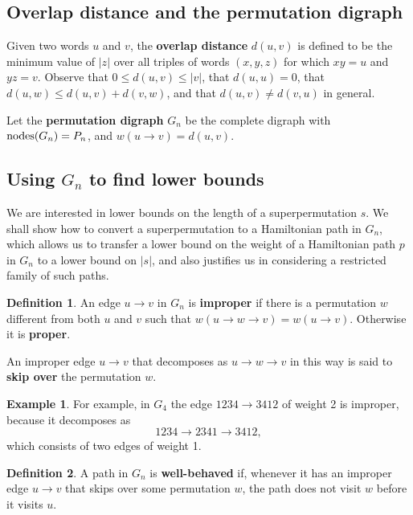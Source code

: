 \documentclass[a4paper]{article}
\theoremstyle{definition}
\newtheorem{defn}{Definition}[section]
\newtheorem{example}{Example}[section]
\theoremstyle{remark}
\let\definiendum\textbf
\begin{document}
\subsection{Overlap distance and the permutation digraph}
Given two words $u$ and $v$, the \definiendum{overlap distance} $d(u,v)$ is defined to be the minimum value of $|z|$ over all triples of words $(x, y, z)$ for which $xy=u$ and $yz=v$. Observe that $0\le d(u,v)\le|v|$, that $d(u,u)=0$, that $d(u,w)\le d(u,v)+d(v,w)$, and that $d(u,v)\ne d(v,u)$ in general.

Let the \definiendum{permutation digraph} $G_n$ be the complete digraph with $\mathrm{nodes}(G_n)=P_n$, and $w(u\to v) = d(u, v)$.

\subsection{Using $G_n$ to find lower bounds}
We are interested in lower bounds on the length of a superpermutation $s$. We shall show how to convert a superpermutation to a Hamiltonian path in $G_n$, which allows us to transfer a lower bound on the weight of a Hamiltonian path $p$ in $G_n$ to a lower bound on $|s|$, and also justifies us in considering a restricted family of such paths.

\begin{defn}
    An edge $u\to v$ in $G_n$ is \definiendum{improper} if there is a permutation $w$ different from both $u$ and $v$ such that $w(u\to w\to v) = w(u\to v)$. Otherwise it is \definiendum{proper}.

    An improper edge $u\to v$ that decomposes as $u\to w\to v$ in this way is said to \definiendum{skip over} the permutation $w$.
\end{defn}
\begin{example}
    For example, in $G_4$ the edge $1234\to 3412$ of weight 2 is improper, because it decomposes as \[
        1234 \to 2341 \to 3412,
    \]
    which consists of two edges of weight 1.
\end{example}
\begin{defn}\label{def:well-behaved}
    A path in $G_n$ is \definiendum{well-behaved} if, whenever it has an improper edge $u\to v$ that skips over some permutation $w$, the path does not visit $w$ before it visits $u$.
\end{defn}
\end{document}
